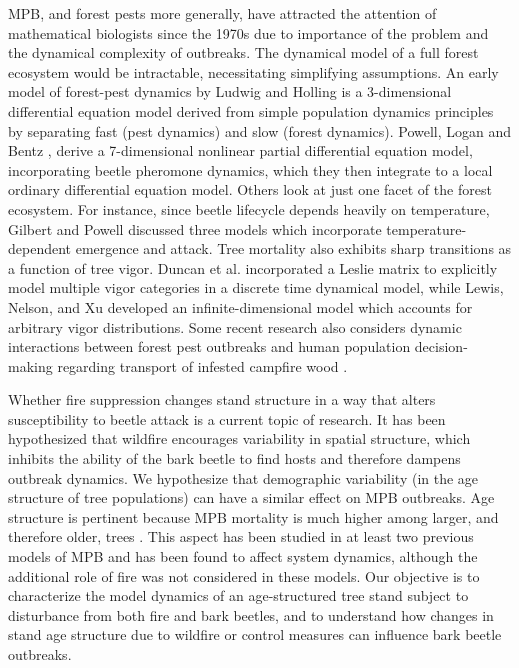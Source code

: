 MPB, and forest pests more generally, have attracted the attention of mathematical biologists since the 1970s due to importance of the problem and the dynamical complexity of outbreaks. The dynamical model of a full forest ecosystem would be intractable, necessitating simplifying assumptions. An early model of forest-pest dynamics by Ludwig and Holling \cite{ludwig1978qualitative} is a 3-dimensional differential equation model derived from simple population dynamics principles by separating fast (pest dynamics) and slow (forest dynamics). Powell, Logan  and Bentz \cite{powell1996local}, derive a 7-dimensional nonlinear partial differential equation model, incorporating beetle pheromone dynamics, which they then integrate to a local ordinary differential equation model. Others look at just one facet of the forest ecosystem. For instance, since beetle lifecycle depends heavily on temperature, Gilbert and Powell \cite{gilbert2004comparison} discussed three models which incorporate temperature-dependent emergence and attack. Tree mortality also exhibits sharp transitions as a function of tree vigor. Duncan et al.\cite{duncan2015model} incorporated a Leslie matrix to explicitly model multiple vigor categories in a discrete time dynamical model, while Lewis, Nelson, and Xu \cite{lewis2010structured} developed an infinite-dimensional model which accounts for arbitrary vigor distributions.  Some recent research also considers dynamic interactions between forest pest outbreaks and human population decision-making regarding transport of infested campfire wood \cite{barlow2014modelling, ali2015coupled}. 

Whether fire suppression changes stand structure in a way that alters susceptibility to beetle attack is a current topic of research.  It has been hypothesized that wildfire encourages variability in spatial structure\cite{seidl2016spatial}, which inhibits the ability of the bark beetle to find hosts and therefore dampens outbreak dynamics. We hypothesize that demographic variability (in the age structure of tree populations) can have a similar effect on MPB outbreaks. Age structure is pertinent because MPB mortality is much higher among larger, and therefore older, trees \cite{axelson2010changes,safranyik2003mountain}. This aspect has been studied in at least two previous models of MPB \cite{lewis2010structured,duncan2015model} and has been found to affect system dynamics, although the additional role of fire was not considered in these models. Our objective is to characterize the model dynamics of an age-structured tree stand subject to disturbance from both fire and bark beetles, and to understand how changes in stand age structure due to wildfire or control measures can influence bark beetle outbreaks. 


